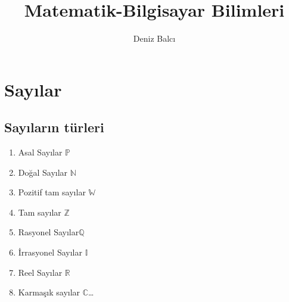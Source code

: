 \documentclass[12pt]{article}
\begin{document}
\title{Matematik-Bilgisayar Bilimleri}
\author{Deniz Balcı\\
}
\renewcommand{\today}{Mayıs 31, 2019}
\maketitle


\section{Sayılar}

\subsection*{Sayıların türleri}

\begin{enumerate}
\item Asal Sayılar $\mathbb{P}$\\
\item Doğal Sayılar  $\mathbb{N}$\\
\item Pozitif tam sayılar $ \mathbb{W}$\\
\item Tam sayılar  $\mathbb{Z}$\\
\item Rasyonel Sayılar$ \mathbb{Q}$\\
\item İrrasyonel Sayılar $ \mathbb{I}$\\
\item Reel Sayılar  $\mathbb{R}$\\
\item Karmaşık sayılar $\mathbb{C}$\ldots 
\end{enumerate}
\end{document}
